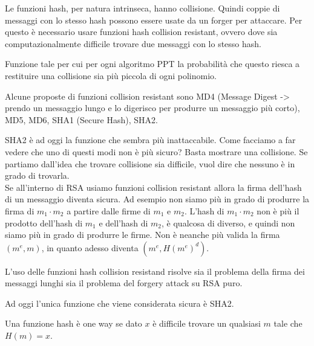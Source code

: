 Le funzioni hash, per natura intrinseca, hanno collisione. Quindi coppie di messaggi con lo stesso hash possono essere usate da un forger per attaccare. Per questo è necessario usare funzioni hash collision resistant, ovvero dove sia computazionalmente difficile trovare due messaggi con lo stesso hash.

\begin{definition}
    Funzione tale per cui per ogni algoritmo PPT la probabilità che questo riesca a restituire una collisione sia più piccola di ogni polinomio. 
\end{definition}

\noindent Alcune proposte di funzioni collision resistant sono MD4 (Message Digest -> prendo un messaggio lungo e lo digerisco per produrre un messaggio più corto), MD5, MD6, SHA1 (Secure Hash), SHA2. 

SHA2 è ad oggi la funzione che sembra più inattaccabile. Come facciamo a far vedere che uno di questi modi non è più sicuro? Basta mostrare una collisione.  Se partiamo dall'idea che trovare collisione sia difficile, vuol dire che nessuno è in grado di trovarla.
\\

\noindent Se all'interno di RSA usiamo funzioni collision resistant allora la firma dell'hash di un messaggio diventa sicura. Ad esempio non siamo più in grado di produrre la firma di $m_1 \cdot m_2$ a partire dalle firme di $m_1$ e $m_2$. L'hash di $m_1 \cdot m_2$ non è più il prodotto dell'hash di $m_1$ e dell'hash di $m_2$, è qualcosa di diverso, e quindi non siamo più in grado di produrre le firme. Non è neanche più valida la firma $(m^e, m)$, in quanto adesso diventa $(m^e, H(m^e)^d)$. 

L'uso delle funzioni hash collision resistand risolve sia il problema della firma dei messaggi lunghi sia il problema del forgery attack su RSA puro.

Ad oggi l'unica funzione che viene considerata sicura è SHA2. 


\begin{definition}
    Una funzione hash è one way se dato $x$ è difficile trovare un qualsiasi $m$ tale che $H(m) = x$. 
\end{definition} 

